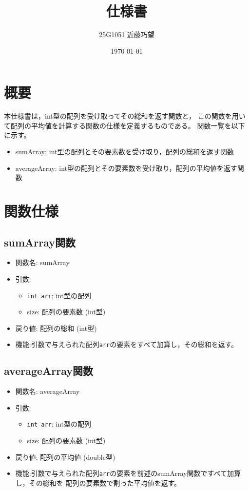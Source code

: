 \documentclass[uplatex,dvipdfmx]{jsarticle}
\begin{document}
\title{仕様書}
\author{25G1051 近藤巧望}
\date{\today}
\maketitle
\tableofcontents
\newpage

\section{概要}
本仕様書は，int型の配列を受け取ってその総和を返す関数と，
この関数を用いて配列の平均値を計算する関数の仕様を定義するものである。
関数一覧を以下に示す。
\begin{itemize}
    \item sumArray: int型の配列とその要素数を受け取り，配列の総和を返す関数
    \item averageArray: int型の配列とその要素数を受け取り，配列の平均値を返す関数
\end{itemize}
\section{関数仕様}
\subsection{sumArray関数}
\begin{itemize}
    \item 関数名: sumArray
    \item 引数:
    \begin{itemize}
        \item \texttt{int arr}: int型の配列
        \item size: 配列の要素数 (int型)
    \end{itemize}
    \item 戻り値: 配列の総和 (int型)
    \item 機能:引数で与えられた配列\texttt{arr}の要素をすべて加算し，その総和を返す。
\end{itemize}
\subsection{averageArray関数}
\begin{itemize}
    \item 関数名: averageArray
    \item 引数:
    \begin{itemize}
        \item \texttt{int arr}: int型の配列
        \item size: 配列の要素数 (int型)
    \end{itemize}
    \item 戻り値: 配列の平均値 (double型)
    \item 機能:引数で与えられた配列\texttt{arr}の要素を前述のsumArray関数ですべて加算し，その総和を
    配列の要素数で割った平均値を返す。
\end{itemize}
\end{document}

